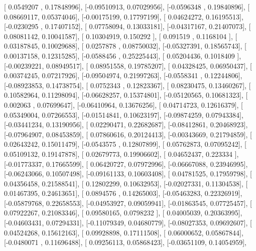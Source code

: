 \documentclass{article}
\begin{document}
       [ 0.0549207 ,  0.17848996],
       [-0.09510913,  0.07029956],
       [-0.0596348 ,  0.19840896],
       [ 0.08669117,  0.05374046],
       [-0.00175199,  0.17797199],
       [ 0.04624272,  0.16195513],
       [-0.0230295 ,  0.17407152],
       [ 0.07758094,  0.13033181],
       [-0.04317167,  0.21407073],
       [ 0.08081142,  0.10041587],
       [ 0.10304919,  0.150292  ],
       [ 0.091519  ,  0.1168104 ],
       [ 0.03187845,  0.10029688],
       [ 0.0257878 ,  0.08750032],
       [-0.05327391,  0.18565743],
       [ 0.00137158,  0.12315285],
       [-0.0588456 ,  0.25225443],
       [ 0.05204436,  0.1018409 ],
       [-0.00239221,  0.08949517],
       [ 0.08951558,  0.19785207],
       [ 0.04328425,  0.06950437],
       [ 0.00374245,  0.07217926],
       [-0.09504974,  0.21997263],
       [-0.0558341 ,  0.12244806],
       [-0.08923853,  0.14738754],
       [ 0.0752343 ,  0.12823367],
       [ 0.08230475,  0.13460267],
       [ 0.10582964,  0.11298094],
       [-0.06628257,  0.15374801],
       [-0.05120565,  0.10681323],
       [ 0.002063  ,  0.07699647],
       [-0.06410964,  0.13676256],
       [ 0.04714723,  0.12616379],
       [ 0.05349004,  0.07266553],
       [-0.01514841,  0.10623197],
       [-0.09874259,  0.07943384],
       [-0.03441234,  0.13190956],
       [ 0.02290471,  0.22682687],
       [-0.08412861,  0.20468923],
       [-0.07964907,  0.08453859],
       [ 0.07860616,  0.20124413],
       [-0.00343669,  0.21794859],
       [ 0.02643242,  0.15011479],
       [-0.0543575 ,  0.12807899],
       [ 0.05762873,  0.07095242],
       [ 0.05109132,  0.19147878],
       [ 0.02679773,  0.19906602],
       [ 0.04652437,  0.223334  ],
       [-0.01773337,  0.17665599],
       [ 0.06420727,  0.07972996],
       [-0.06667088,  0.23946995],
       [-0.06243066,  0.10507498],
       [-0.09161133,  0.10603408],
       [ 0.04781525,  0.17959798],
       [ 0.04356458,  0.21588541],
       [ 0.12802299,  0.10632953],
       [-0.02027331,  0.11304538],
       [ 0.01467395,  0.24613651],
       [ 0.0894576 ,  0.14265003],
       [-0.05463283,  0.22326919],
       [-0.05879768,  0.22658553],
       [-0.04953927,  0.09059941],
       [-0.01863545,  0.07725457],
       [ 0.07922267,  0.21083346],
       [ 0.09580165,  0.0798232 ],
       [ 0.04005039,  0.20363995],
       [-0.04603431,  0.07294331],
       [-0.11079349,  0.04680779],
       [-0.08027353,  0.09692607],
       [ 0.04524268,  0.15612163],
       [ 0.09928898,  0.17111508],
       [ 0.06000652,  0.05867844],
       [-0.0480071 ,  0.11696488],
       [ 0.09256113,  0.05868423],
       [-0.03651109,  0.14054959],
\end{document}
